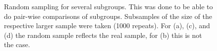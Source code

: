 \begin{center}
\begin{figure}[H]
		\caption[Random sampling]{Random sampling for several subgroups. This was done to be able to do pair-wise comparisons of subgroups. Subsamples of the size of the respective larger sample were taken (1000 repeats). For (a), (c), and (d) the random sample reflects the real sample, for (b) this is not the case.}
		\label{fig:RSadd}
	\end{figure}
\end{center}



